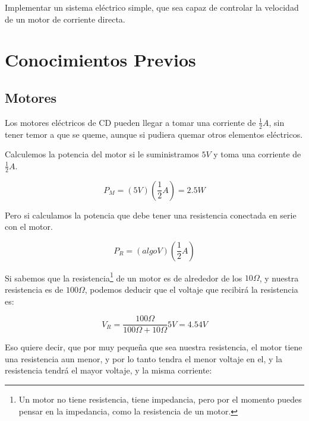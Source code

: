 	Implementar un sistema eléctrico simple, que sea capaz de controlar la velocidad de un motor de corriente directa.


\section{Conocimientos Previos}


	\subsection{Motores}
		
		Los motores eléctricos de CD pueden llegar a tomar una corriente de $\frac{1}{2} A$, sin tener temor a que se queme, aunque si pudiera quemar otros elementos eléctricos.

		Calculemos la potencia del motor si le suministramos $5 V$ y toma una corriente de $\frac{1}{2} A$.

		\begin{equation}
			P_{M} = \left(5 V \right) \left( \frac{1}{2} A \right) = 2.5 W
		\end{equation}

		Pero si calculamos la potencia que debe tener una resistencia conectada en serie con el motor.

		\begin{equation}
			P_{R} = \left( algo V \right) \left( \frac{1}{2} A \right)
		\end{equation}

		Si sabemos que la resistencia\footnote{Un motor no tiene resistencia, tiene impedancia, pero por el momento puedes pensar en la impedancia, como la resistencia de un motor.} de un motor es de alrededor de los $10 \Omega$, y nuestra resistencia es de $100 \Omega$, podemos deducir que el voltaje que recibirá la resistencia es:

		\begin{equation}
			V_{R} = \frac{100 \Omega}{100 \Omega + 10 \Omega} 5 V = 4.54 V 
		\end{equation}

		Eso quiere decir, que por muy pequeña que sea nuestra resistencia, el motor tiene una resistencia aun menor, y por lo tanto tendra el menor voltaje en el, y la resistencia tendrá el mayor voltaje, y la misma corriente:

